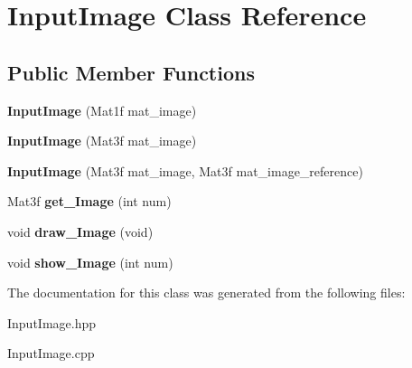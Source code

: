 \hypertarget{classInputImage}{}\section{Input\+Image Class Reference}
\label{classInputImage}
\subsection*{Public Member Functions}
\begin{DoxyCompactItemize}
\item 
{\bfseries Input\+Image} (Mat1f mat\+\_\+image)\hypertarget{classInputImage_a37454b8778c2dfc528a5cd7e25916181}{}\label{classInputImage_a37454b8778c2dfc528a5cd7e25916181}

\item 
{\bfseries Input\+Image} (Mat3f mat\+\_\+image)\hypertarget{classInputImage_a5a6e1d33c07d55cd3412146e83d4db9e}{}\label{classInputImage_a5a6e1d33c07d55cd3412146e83d4db9e}

\item 
{\bfseries Input\+Image} (Mat3f mat\+\_\+image, Mat3f mat\+\_\+image\+\_\+reference)\hypertarget{classInputImage_af9b40c22378994b2ef4005434c4c2a18}{}\label{classInputImage_af9b40c22378994b2ef4005434c4c2a18}

\item 
Mat3f {\bfseries get\+\_\+\+Image} (int num)\hypertarget{classInputImage_a108d36633c6e3aa5e3742d4083984245}{}\label{classInputImage_a108d36633c6e3aa5e3742d4083984245}

\item 
void {\bfseries draw\+\_\+\+Image} (void)\hypertarget{classInputImage_ae9ee4181b5e0dcee6dea4ed1fd0c96f9}{}\label{classInputImage_ae9ee4181b5e0dcee6dea4ed1fd0c96f9}

\item 
void {\bfseries show\+\_\+\+Image} (int num)\hypertarget{classInputImage_afd2a54bf7bdd3f0a964d2e20d320951f}{}\label{classInputImage_afd2a54bf7bdd3f0a964d2e20d320951f}

\end{DoxyCompactItemize}


The documentation for this class was generated from the following files\+:\begin{DoxyCompactItemize}
\item 
Input\+Image.\+hpp\item 
Input\+Image.\+cpp\end{DoxyCompactItemize}
